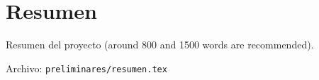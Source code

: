 %

\chapter{Resumen}

Resumen del proyecto (around 800 and 1500 words are recommended).

Archivo: \texttt{preliminares/resumen.tex}

\endinput
